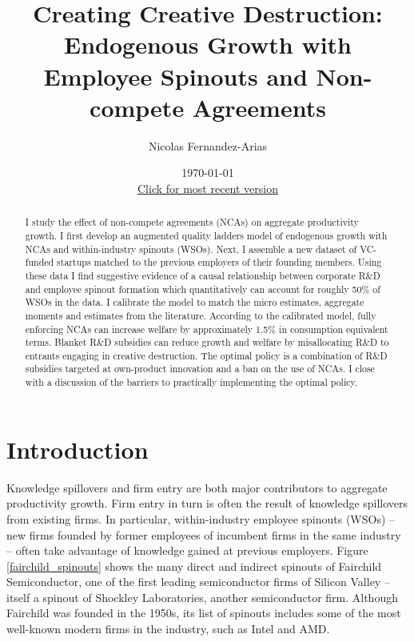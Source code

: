 \documentclass[11pt,english]{article}
\theoremstyle{remark}
\begin{document}
	
\title{Creating Creative Destruction: Endogenous Growth with Employee Spinouts and Non-compete Agreements}

\author{Nicolas Fernandez-Arias} 
\date{\today \\ \small
	\href{https://drive.google.com/file/d/1bnm90ZWuRin-JhtQvOfc_2SczClHDXxy/view?usp=sharing}{Click for most recent version}}
\maketitle



\begin{abstract}
	I study the effect of non-compete agreements (NCAs) on aggregate productivity growth. I first develop an augmented quality ladders model of endogenous growth with NCAs and within-industry spinouts (WSOs). Next, I assemble a new dataset of VC-funded startups matched to the previous employers of their founding members. Using these data I find suggestive evidence of a causal relationship between corporate R\&D and employee spinout formation which quantitatively can account for roughly 50\% of WSOs in the data. I calibrate the model to match the micro estimates, aggregate moments and estimates from the literature. According to the calibrated model, fully enforcing NCAs can increase welfare by approximately 1.5\% in consumption equivalent terms. Blanket R\&D subsidies can reduce growth and welfare by misallocating R\&D to entrants engaging in creative destruction. The optimal policy is a combination of R\&D subsidies targeted at own-product innovation and a ban on the use of NCAs. I close with a discussion of the barriers to practically implementing the optimal policy.
\end{abstract}

\section{Introduction}

Knowledge spillovers and firm entry are both major contributors to aggregate productivity growth. Firm entry in turn is often the result of knowledge spillovers from existing firms. In particular, within-industry employee spinouts (WSOs) -- new firms founded by former employees of incumbent firms in the same industry -- often take advantage of knowledge gained at previous employers. Figure \ref{fairchild_spinouts} shows the many direct and indirect spinouts of Fairchild Semiconductor, one of the first leading semiconductor firms of Silicon Valley -- itself a spinout of Shockley Laboratories, another semiconductor firm. Although Fairchild was founded in the 1950s, its list of spinouts includes some of the most well-known modern firms in the industry, such as Intel and AMD. 
\end{document}
